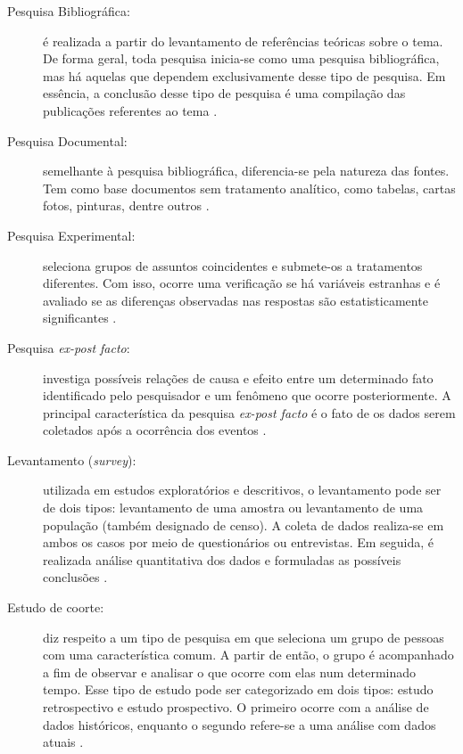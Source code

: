 \begin{description}
\item[Pesquisa Bibliográfica:] é realizada a partir do levantamento de referências teóricas sobre o tema. De forma geral, toda pesquisa inicia-se como uma pesquisa bibliográfica, mas há aquelas que dependem exclusivamente desse tipo de pesquisa. Em essência, a conclusão desse tipo de pesquisa é uma compilação das publicações referentes ao tema \cite{prodanov2013}.  

\item[Pesquisa Documental:] semelhante à pesquisa bibliográfica, diferencia-se pela natureza das fontes. Tem como base documentos sem tratamento analítico, como tabelas, cartas fotos, pinturas, dentre outros \cite{gil2002}. 

\item[Pesquisa Experimental:] seleciona grupos de assuntos coincidentes e submete-os a tratamentos diferentes. Com isso, ocorre uma verificação se há variáveis estranhas e é avaliado se as diferenças observadas nas respostas são estatisticamente significantes \cite{tafner2007}.

\item[Pesquisa \textit{ex-post facto}:] investiga possíveis relações de causa e efeito entre um determinado fato identificado pelo pesquisador e um fenômeno que ocorre posteriormente. A principal característica da pesquisa \textit{ex-post facto} é o fato de os dados serem coletados após a ocorrência dos eventos \cite{gil2002}.

\item[Levantamento (\textit{survey}):] utilizada em estudos exploratórios e descritivos, o levantamento pode ser de dois tipos: levantamento de uma amostra ou levantamento de uma população (também designado de censo). A coleta de dados realiza-se em ambos os casos por meio de questionários ou entrevistas. Em seguida, é realizada análise quantitativa dos dados e formuladas as possíveis conclusões \cite{prodanov2013}.

\item[Estudo de coorte:] diz respeito a um tipo de pesquisa em que seleciona um grupo de pessoas com uma característica comum. A partir de então, o grupo é acompanhado a fim de observar e analisar o que ocorre com elas num determinado tempo. Esse tipo de estudo pode ser categorizado em dois tipos: estudo retrospectivo e estudo prospectivo. O primeiro ocorre com a análise de dados históricos, enquanto o segundo refere-se a uma análise com dados atuais \cite{gil2002}.   


\end{description}
